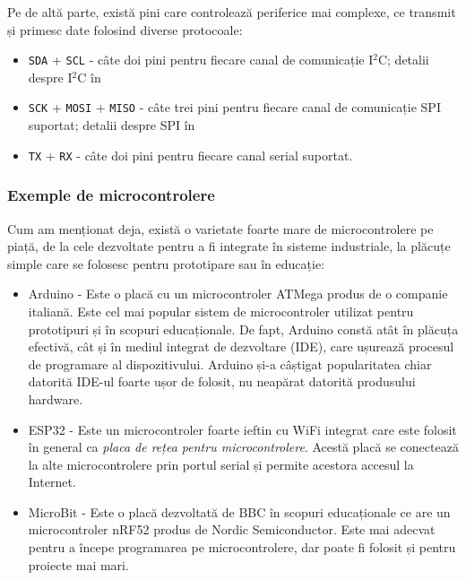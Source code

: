 Pe de altă parte, există pini care controlează periferice mai complexe, ce transmit și primesc date folosind diverse protocoale:

\begin{itemize}
  \item \texttt{SDA} + \texttt{SCL} - câte doi pini pentru fiecare canal de comunicație I$^2$C;
    detalii despre I$^2$C în 
  \item \texttt{SCK} + \texttt{MOSI} + \texttt{MISO} - câte trei pini pentru fiecare canal de comunicație SPI suportat;
    detalii despre SPI în 
  \item \texttt{TX} + \texttt{RX} - câte doi pini pentru fiecare canal serial suportat.
\end{itemize}

\subsubsection{Exemple de microcontrolere}
\label{sec:embed:micro-comp:micro:example}

Cum am menționat deja, există o varietate foarte mare de microcontrolere pe piață, de la cele dezvoltate pentru a fi integrate în sisteme industriale, la plăcuțe simple care se folosesc pentru prototipare sau în educație:

\begin{itemize}
  \item Arduino - Este o placă cu un microcontroler ATMega produs de o companie italiană.
    Este cel mai popular sistem de microcontroler utilizat pentru prototipuri și în scopuri educaționale.
    De fapt, Arduino constă atât în plăcuța efectivă, cât și în mediul integrat de dezvoltare (IDE), care ușurează procesul de programare al dispozitivului.
    Arduino și-a câștigat popularitatea chiar datorită IDE-ul foarte ușor de folosit, nu neapărat datorită produsului hardware.
  \item ESP32 - Este un microcontroler foarte ieftin cu WiFi integrat care este folosit în general ca \textit{placa de rețea pentru microcontrolere}.
    Acestă placă se conectează la alte microcontrolere prin portul serial și permite acestora accesul la Internet.
  \item MicroBit - Este o placă dezvoltată de BBC în scopuri educaționale ce are un microcontroler nRF52 produs de Nordic Semiconductor.
    Este mai adecvat pentru a începe programarea pe microcontrolere, dar poate fi folosit și pentru proiecte mai mari.
\end{itemize}

